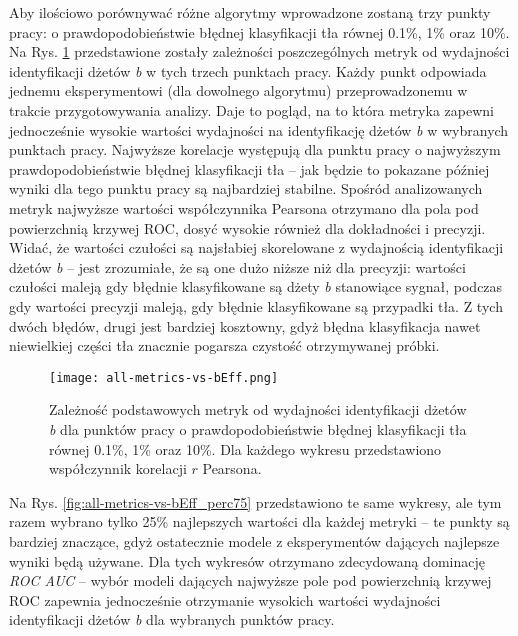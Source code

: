 Aby ilościowo porównywać różne algorytmy wprowadzone zostaną trzy punkty pracy: o prawdopodobieństwie błędnej klasyfikacji tła równej 0.1\%, 1\% oraz 10\%.
Na Rys. \ref{fig:all-metrics-vs-bEff} przedstawione zostały zależności poszczególnych metryk od wydajności identyfikacji dżetów \textit{b} w tych trzech punktach pracy. Każdy punkt odpowiada jednemu eksperymentowi (dla dowolnego algorytmu) przeprowadzonemu w trakcie przygotowywania analizy. Daje to pogląd, na to która metryka zapewni jednocześnie wysokie wartości wydajności na identyfikację dżetów \textit{b} w wybranych punktach pracy. 
Najwyższe korelacje występują dla punktu pracy o najwyższym prawdopodobieństwie błędnej klasyfikacji tła -- jak będzie to pokazane później wyniki dla tego punktu pracy są najbardziej stabilne. Spośród analizowanych metryk najwyższe wartości współczynnika Pearsona otrzymano dla pola pod powierzchnią krzywej ROC, dosyć wysokie również dla dokładności i precyzji. Widać, że wartości czułości są najsłabiej skorelowane z wydajnością identyfikacji dżetów \textit{b} -- jest zrozumiałe, że są one dużo niższe niż dla precyzji: wartości czułości maleją gdy błędnie klasyfikowane są dżety \textit{b} stanowiące sygnał, podczas gdy wartości precyzji maleją, gdy błędnie klasyfikowane są przypadki tła. 
Z tych dwóch błędów, drugi jest bardziej kosztowny, gdyż błędna klasyfikacja nawet niewielkiej części tła znacznie pogarsza czystość otrzymywanej próbki.


\begin{figure}[ht]
	\centering
	\texttt{[image: all-metrics-vs-bEff.png]}
	\caption{Zależność podstawowych metryk od wydajności identyfikacji dżetów \textit{b} dla punktów pracy o prawdopodobieństwie błędnej klasyfikacji tła równej 0.1\%, 1\% oraz 10\%. Dla każdego wykresu przedstawiono współczynnik korelacji $r$ Pearsona.}
	\label{fig:all-metrics-vs-bEff}
\end{figure}

Na Rys. \ref{fig:all-metrics-vs-bEff_perc75} przedstawiono te same wykresy, ale tym razem wybrano tylko 25\% najlepszych wartości dla każdej metryki -- te punkty są bardziej znaczące, gdyż ostatecznie modele z eksperymentów dających najlepsze wyniki będą używane.
Dla tych wykresów otrzymano zdecydowaną dominację \textit{ROC AUC} -- wybór modeli dających najwyższe pole pod powierzchnią krzywej ROC zapewnia jednocześnie otrzymanie wysokich wartości wydajności identyfikacji dżetów \textit{b} dla wybranych punktów pracy.

